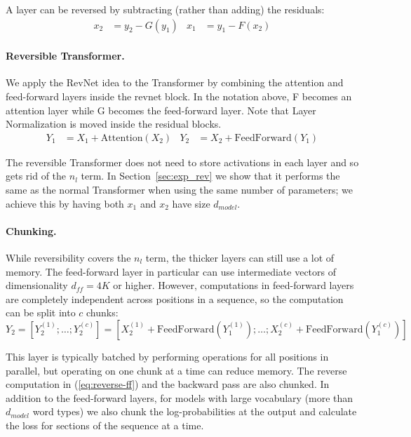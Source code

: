 A layer can be reversed by subtracting (rather than adding) the residuals:
\begin{align}\label{eq:reverse-ff}
    x_2 &= y_2 - G(y_1) &
    x_1 &= y_1 - F(x_2)
\end{align}

\paragraph{Reversible Transformer.}
We apply the RevNet idea to the Transformer by combining the attention and
feed-forward layers inside the revnet block. In the notation above,
F becomes an attention layer while G becomes the feed-forward layer. Note that Layer Normalization \citep{layernorm2016} is moved inside the residual blocks.
\begin{align}
    Y_1 &= X_1 + \mathrm{Attention}(X_2) &
    Y_2 &= X_2 + \mathrm{FeedForward}(Y_1)
\end{align}

The reversible Transformer does not need to store activations in each layer
and so gets rid of the $n_l$ term.  In Section~\ref{sec:exp_rev} we show that it performs the same as the normal Transformer when using  the same number of parameters; we achieve this by having both $x_1$ and $x_2$ have size $d_{model}$.

\paragraph{Chunking.}
While reversibility covers the $n_l$ term, the thicker layers can still use
a lot of memory. The feed-forward layer in particular can use intermediate vectors 
of dimensionality $d_{ff}=4K$ or higher. However, computations in feed-forward layers 
are completely independent across positions in a sequence, so the computation can be split 
into $c$ chunks:
\begin{equation}
    Y_2 = \left[Y_2^{(1)}; \ldots; Y_2^{(c)}\right] = \left[X_2^{(1)} + \mathrm{FeedForward}(Y_1^{(1)}); \ldots; X_2^{(c)} + \mathrm{FeedForward}(Y_1^{(c)})\right]
\end{equation}

This layer is typically batched by performing operations for all positions in parallel, but operating on one chunk at a time can reduce memory. The reverse computation in (\ref{eq:reverse-ff}) and the backward pass are also chunked.
In addition to the feed-forward layers, for models with large vocabulary (more than $d_{model}$ word types) we also chunk the log-probabilities at the output and calculate the loss for sections of the sequence at a time.

